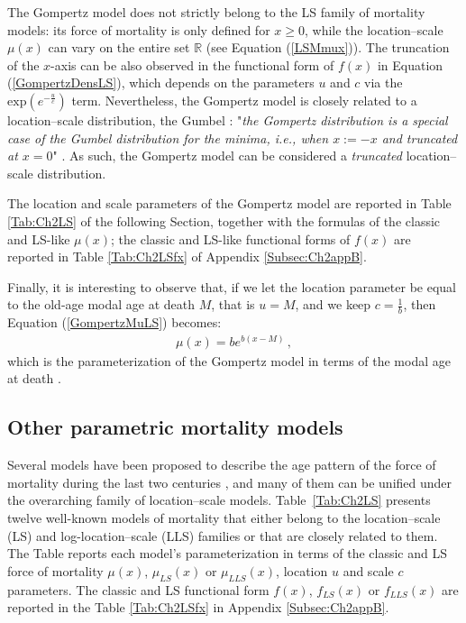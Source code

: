 \documentclass[Thesis]{subfiles}
\begin{document}
The Gompertz model does not strictly belong to the LS family of mortality models: its force of mortality is only defined for $x\geq0$, while the location--scale $\mu(x)$ can vary on the entire set $\mathbb{R}$ (see Equation (\ref{LSMmux})). The truncation of the $x$-axis can be also observed in the functional form of $f(x)$ in Equation (\ref{GompertzDensLS}), which depends on the parameters $u$ and $c$ via the $\mathrm{exp} \left ( e^{- \frac{u}{c}} \right )$ term. Nevertheless, the Gompertz model is closely related to a location--scale distribution, the Gumbel \cite[or type 1 extreme value distribution,][]{johnson1995continuous} : "\textit{the Gompertz distribution is a special case of the Gumbel distribution for the minima, i.e., when $x:=-x$ and truncated at $x=0$}" \cite[p.~2923,][]{lenart2016goodness}. As such, the Gompertz model can be considered a \textit{truncated} location--scale distribution.

The location and scale parameters of the Gompertz model are reported in Table \ref{Tab:Ch2LS} of the following Section, together with the formulas of the classic and LS-like $\mu(x)$; the classic and LS-like functional forms of $f(x)$ are reported in Table \ref{Tab:Ch2LSfx} of Appendix \ref{Subsec:Ch2appB}.

Finally, it is interesting to observe that, if we let the location parameter be equal to the old-age modal age at death $M$, that is $u=M$, and we keep $c=\frac{1}{b}$, then Equation (\ref{GompertzMuLS}) becomes:
\begin{eqnarray}\label{GompertzMuM}
\mu (x) = be^{b(x-M)} \, ,
\end{eqnarray}
which is the parameterization of the Gompertz model in terms of the modal age at death \citep{horiuchi2013modal, missov2015gompertz}.

\subsection{Other parametric mortality models}
\label{Subsec:Ch2subsec2.4}

Several models have been proposed to describe the age pattern of the force of mortality during the last two centuries \citep[for a comprehensive review, see][]{tabeau2001review}, and many of them can be unified under the overarching family of location--scale models. Table~\ref{Tab:Ch2LS} presents twelve well-known models of mortality that either belong to the location--scale (LS) and log-location--scale (LLS) families or that are closely related to them. The Table reports each model's parameterization in terms of the classic and LS force of mortality $\mu(x)$, $\mu_{LS}(x)$ or $\mu_{LLS}(x)$, location $u$ and scale $c$ parameters. The classic and LS functional form $f(x)$, $f_{LS}(x)$ or $f_{LLS}(x)$ are reported in the Table \ref{Tab:Ch2LSfx} in Appendix \ref{Subsec:Ch2appB}.
\end{document}
